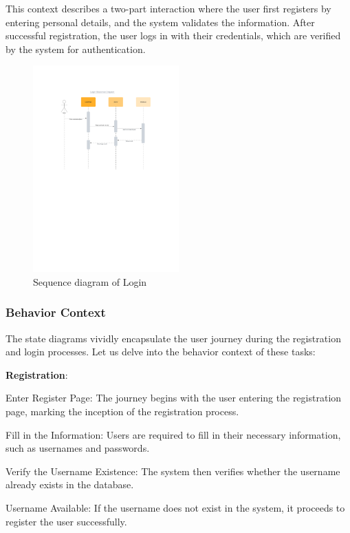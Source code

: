 \documentclass[conference]{IEEEtran}
\begin{document}
This context describes a two-part interaction where the user first registers by entering personal details, and the system validates the information. After successful registration, the user logs in with their credentials, which are verified by the system for authentication.
\begin{figure}[htbp]
	\centerline{\includegraphics[width=0.5\textwidth]{Diagram_of_Login_and_Register/Sequence_diagram_of_login.pdf}}
	\caption{Sequence diagram of Login }
	\label{Sequence_diagram_of_login}
\end{figure}
\subsubsection{\textbf{Behavior Context}}
\textbf{}

The state diagrams vividly encapsulate the user journey during the registration and login processes. Let us delve into the behavior context of these tasks:

\textbf{Registration}:

Enter Register Page: The journey begins with the user entering the registration page, marking the inception of the registration process.

Fill in the Information: Users are required to fill in their necessary information, such as usernames and passwords.

Verify the Username Existence: The system then verifies whether the username already exists in the database.

Username Available: If the username does not exist in the system, it proceeds to register the user successfully.
\end{document}
